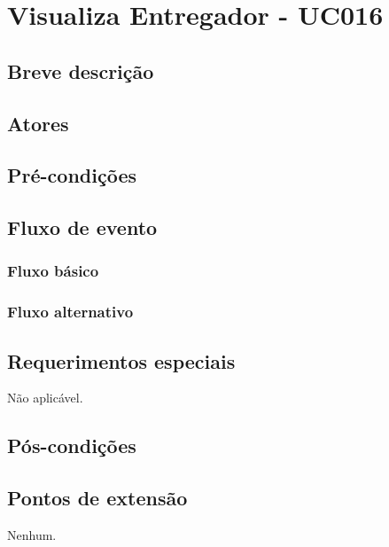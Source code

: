 \chapter{Visualiza Entregador - UC016} \label{uc016}

\section{Breve descrição}

\section{Atores}

\section{Pré-condições}

\section{Fluxo de evento}

\subsection{Fluxo básico}

\subsection{Fluxo alternativo}

\section{Requerimentos especiais}

Não aplicável.

\section{Pós-condições}

\section{Pontos de extensão}

Nenhum.